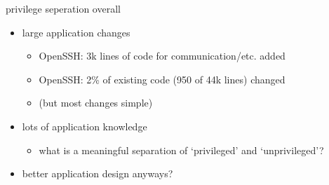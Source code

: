 \begin{frame}{privilege seperation overall}
    \begin{itemize}
    \item large application changes
        \begin{itemize}
        \item OpenSSH: 3k lines of code for communication/etc. added
        \item OpenSSH: 2\% of existing code (950 of 44k lines) changed
        \item (but most changes simple)
        \end{itemize}
    \item lots of application knowledge
        \begin{itemize}
        \item what is a meaningful separation of `privileged' and `unprivileged'?
        \end{itemize}
    \item better application design anyways?
    \end{itemize}
\end{frame}


